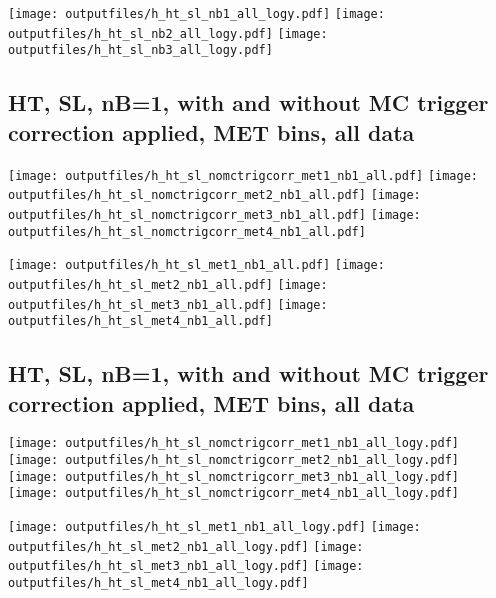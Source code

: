 \documentclass[11pt]{article}
\begin{document}
    \noindent
     \texttt{[image: outputfiles/h\_ht\_sl\_nb1\_all\_logy.pdf]}
     \texttt{[image: outputfiles/h\_ht\_sl\_nb2\_all\_logy.pdf]}
     \texttt{[image: outputfiles/h\_ht\_sl\_nb3\_all\_logy.pdf]}


     \subsection{ HT, SL, nB=1, with and without MC trigger correction applied, MET bins, all data}

    \noindent
     \texttt{[image: outputfiles/h\_ht\_sl\_nomctrigcorr\_met1\_nb1\_all.pdf]}
     \texttt{[image: outputfiles/h\_ht\_sl\_nomctrigcorr\_met2\_nb1\_all.pdf]}
     \texttt{[image: outputfiles/h\_ht\_sl\_nomctrigcorr\_met3\_nb1\_all.pdf]}
     \texttt{[image: outputfiles/h\_ht\_sl\_nomctrigcorr\_met4\_nb1\_all.pdf]}

    \noindent
     \texttt{[image: outputfiles/h\_ht\_sl\_met1\_nb1\_all.pdf]}
     \texttt{[image: outputfiles/h\_ht\_sl\_met2\_nb1\_all.pdf]}
     \texttt{[image: outputfiles/h\_ht\_sl\_met3\_nb1\_all.pdf]}
     \texttt{[image: outputfiles/h\_ht\_sl\_met4\_nb1\_all.pdf]}

   \clearpage
     \subsection{ HT, SL, nB=1, with and without MC trigger correction applied, MET bins, all data}

    \noindent
     \texttt{[image: outputfiles/h\_ht\_sl\_nomctrigcorr\_met1\_nb1\_all\_logy.pdf]}
     \texttt{[image: outputfiles/h\_ht\_sl\_nomctrigcorr\_met2\_nb1\_all\_logy.pdf]}
     \texttt{[image: outputfiles/h\_ht\_sl\_nomctrigcorr\_met3\_nb1\_all\_logy.pdf]}
     \texttt{[image: outputfiles/h\_ht\_sl\_nomctrigcorr\_met4\_nb1\_all\_logy.pdf]}

    \noindent
     \texttt{[image: outputfiles/h\_ht\_sl\_met1\_nb1\_all\_logy.pdf]}
     \texttt{[image: outputfiles/h\_ht\_sl\_met2\_nb1\_all\_logy.pdf]}
     \texttt{[image: outputfiles/h\_ht\_sl\_met3\_nb1\_all\_logy.pdf]}
     \texttt{[image: outputfiles/h\_ht\_sl\_met4\_nb1\_all\_logy.pdf]}
\end{document}
